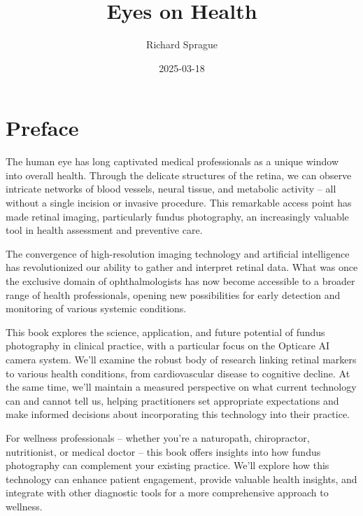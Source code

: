 \documentclass[
  Letterpaper,
]{scrbook}
\title{Eyes on Health}
\author{Richard Sprague}
\date{2025-03-18}
\renewcommand*\contentsname{Table of contents}
\newcommand\contentsname{Table of contents}
\begin{document}
\frontmatter
\maketitle

\renewcommand*\contentsname{Table of contents}
{
\setcounter{tocdepth}{2}
\tableofcontents
}

\mainmatter
{}

\chapter*{Preface}\label{preface}


The human eye has long captivated medical professionals as a unique
window into overall health. Through the delicate structures of the
retina, we can observe intricate networks of blood vessels, neural
tissue, and metabolic activity -- all without a single incision or
invasive procedure. This remarkable access point has made retinal
imaging, particularly fundus photography, an increasingly valuable tool
in health assessment and preventive care.

The convergence of high-resolution imaging technology and artificial
intelligence has revolutionized our ability to gather and interpret
retinal data. What was once the exclusive domain of ophthalmologists has
now become accessible to a broader range of health professionals,
opening new possibilities for early detection and monitoring of various
systemic conditions.

This book explores the science, application, and future potential of
fundus photography in clinical practice, with a particular focus on the
Opticare AI camera system. We'll examine the robust body of research
linking retinal markers to various health conditions, from
cardiovascular disease to cognitive decline. At the same time, we'll
maintain a measured perspective on what current technology can and
cannot tell us, helping practitioners set appropriate expectations and
make informed decisions about incorporating this technology into their
practice.

For wellness professionals -- whether you're a naturopath, chiropractor,
nutritionist, or medical doctor -- this book offers insights into how
fundus photography can complement your existing practice. We'll explore
how this technology can enhance patient engagement, provide valuable
health insights, and integrate with other diagnostic tools for a more
comprehensive approach to wellness.
\end{document}
